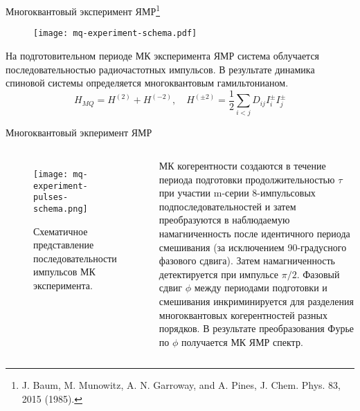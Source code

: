 \begin{frame}{Многоквантовый эксперимент ЯМР\footnote[frame]{
J. Baum, M. Munowitz, A. N. Garroway, and A. Pines, J. Chem. Phys. 83, 2015 (1985).}}

  \begin{figure}
    \texttt{[image: mq-experiment-schema.pdf]}
  \end{figure}
  \vspace{-3mm}
  \begin{block}{}
    На подготовительном периоде МК эксперимента ЯМР система облучается последовательностью радиочастотных импульсов. В результате динамика спиновой системы определяется многоквантовым гамильтонианом.
    $$
    H_{MQ} = H^{(2)} + H^{(-2)},
    \quad H^{(\pm2)} = \frac 1 2 \sum_{i < j} D_{ij} I^\pm_i I^\pm_j
    $$
  \end{block}
\end{frame}

\begin{frame}{Многоквантовый экперимент ЯМР}
  \begin{columns}

    \begin{figure}
      \texttt{[image: mq-experiment-pulses-schema.png]}
      \caption{Схематичное представление последовательности импульсов МК эксперимента.}
    \end{figure}


    МК когерентности создаются в течение периода подготовки продолжительностью $\tau$ при участии m-серии 8-импульсовых подпоследовательностей и затем преобразуются в наблюдаемую намагниченность после идентичного периода смешивания (за исключением 90-градусного фазового сдвига). Затем намагниченность детектируется при импульсе $\pi/2$. Фазовый сдвиг $\phi$ между периодами подготовки и смешивания инкриминируется для разделения многоквантовых когерентностей разных порядков. В результате преобразования Фурье по $\phi$ получается МК ЯМР спектр.
  \end{columns}
\end{frame}